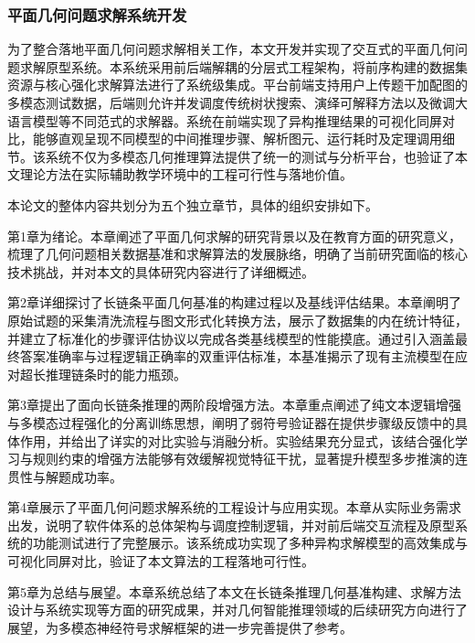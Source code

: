 \subsubsection{平面几何问题求解系统开发}
为了整合落地平面几何问题求解相关工作，本文开发并实现了交互式的平面几何问题求解原型系统。本系统采用前后端解耦的分层式工程架构，将前序构建的数据集资源与核心强化求解算法进行了系统级集成。平台前端支持用户上传题干加配图的多模态测试数据，后端则允许并发调度传统树状搜索、演绎可解释方法以及微调大语言模型等不同范式的求解器。系统在前端实现了异构推理结果的可视化同屏对比，能够直观呈现不同模型的中间推理步骤、解析图元、运行耗时及定理调用细节。该系统不仅为多模态几何推理算法提供了统一的测试与分析平台，也验证了本文理论方法在实际辅助教学环境中的工程可行性与落地价值。

本论文的整体内容共划分为五个独立章节，具体的组织安排如下。

第1章为绪论。本章阐述了平面几何求解的研究背景以及在教育方面的研究意义，梳理了几何问题相关数据基准和求解算法的发展脉络，明确了当前研究面临的核心技术挑战，并对本文的具体研究内容进行了详细概述。


第2章详细探讨了长链条平面几何基准的构建过程以及基线评估结果。本章阐明了原始试题的采集清洗流程与图文形式化转换方法，展示了数据集的内在统计特征，并建立了标准化的步骤评估协议以完成各类基线模型的性能摸底。通过引入涵盖最终答案准确率与过程逻辑正确率的双重评估标准，本基准揭示了现有主流模型在应对超长推理链条时的能力瓶颈。

第3章提出了面向长链条推理的两阶段增强方法。本章重点阐述了纯文本逻辑增强与多模态过程强化的分离训练思想，阐明了弱符号验证器在提供步骤级反馈中的具体作用，并给出了详实的对比实验与消融分析。实验结果充分显式，该结合强化学习与规则约束的增强方法能够有效缓解视觉特征干扰，显著提升模型多步推演的连贯性与解题成功率。

第4章展示了平面几何问题求解系统的工程设计与应用实现。本章从实际业务需求出发，说明了软件体系的总体架构与调度控制逻辑，并对前后端交互流程及原型系统的功能测试进行了完整展示。该系统成功实现了多种异构求解模型的高效集成与可视化同屏对比，验证了本文算法的工程落地可行性。

第5章为总结与展望。本章系统总结了本文在长链条推理几何基准构建、求解方法设计与系统实现等方面的研究成果，并对几何智能推理领域的后续研究方向进行了展望，为多模态神经符号求解框架的进一步完善提供了参考。
